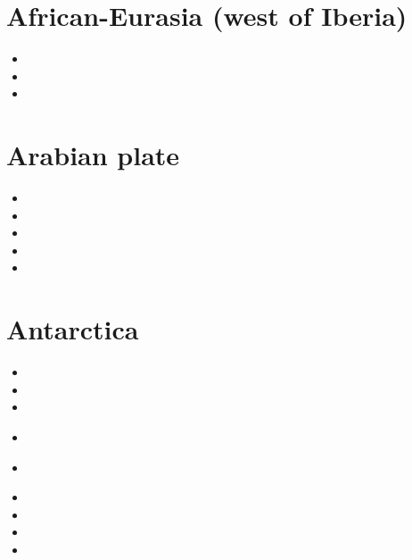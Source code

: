 \section{African-Eurasia (west of Iberia)}

\begin{small}
\begin{itemize}
\item[\twothousandthree]
\item[\twothousandten]
\item[\twothousandnineteen]
\end{itemize}
\end{small}


\section{Arabian plate}

\begin{small}
\begin{itemize}
\item[\twothousandthirteen] 
\item[\twothousandfifteen] 
\item[\twothousandeighteen] 
\item[\twothousandtwenty] 
\item[\twothousandtwentytwo] 
\end{itemize}
\end{small}

\section{Antarctica}

\begin{small}
\begin{itemize}
\item[\nineteenninetyeight]
\item[\twothousandseven]
\item[\twothousandten]
\item[\twothousandtwelve]
 \\ 
\item[\twothousandthirteen]
 \\
\item[\twothousandfifteen]
\item[\twothousandeighteen]
\item[\twothousandtwentyone]
\item[\twothousandtwentythree]
\end{itemize}
\end{small}

